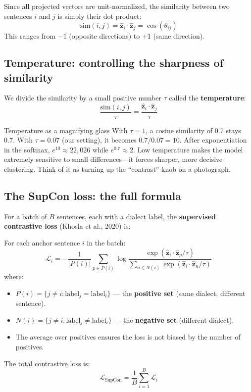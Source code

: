 \documentclass[11pt,a4paper]{article}
\theoremstyle{definition}
\begin{document}
Since all projected vectors are unit-normalized, the similarity
between two sentences $i$ and $j$ is simply their dot product:
\[
\text{sim}(i, j) = \hat{\mathbf{z}}_i \cdot \hat{\mathbf{z}}_j
= \cos(\theta_{ij})
\]
This ranges from $-1$ (opposite directions) to $+1$ (same direction).

\subsection{Temperature: controlling the sharpness of similarity}

We divide the similarity by a small positive number $\tau$ called the
\textbf{temperature}:
\[
\frac{\text{sim}(i,j)}{\tau}
= \frac{\hat{\mathbf{z}}_i \cdot \hat{\mathbf{z}}_j}{\tau}
\]

\begin{intuition}{Temperature as a magnifying glass}
With $\tau = 1$, a cosine similarity of 0.7 stays 0.7. With $\tau =
0.07$ (our setting), it becomes $0.7 / 0.07 = 10$. After
exponentiation in the softmax, $e^{10} \approx 22{,}026$ while
$e^{0.7} \approx 2$. Low temperature makes the model extremely
sensitive to small differences---it forces sharper, more decisive
clustering. Think of it as turning up the ``contrast'' knob on a
photograph.
\end{intuition}

\subsection{The SupCon loss: the full formula}

For a batch of $B$ sentences, each with a dialect label, the
\textbf{supervised contrastive loss} (Khosla et al., 2020) is:

\begin{mathbox}
For each anchor sentence $i$ in the batch:
\[
\mathcal{L}_i = -\frac{1}{|P(i)|}
\sum_{p \in P(i)}
\log \frac{
  \exp(\hat{\mathbf{z}}_i \cdot \hat{\mathbf{z}}_p / \tau)
}{
  \displaystyle\sum_{n \in N(i)} \exp(\hat{\mathbf{z}}_i \cdot \hat{\mathbf{z}}_n / \tau)
}
\]
where:
\begin{itemize}[nosep]
  \item $P(i) = \{j \neq i : \text{label}_j = \text{label}_i\}$ ---
        the \textbf{positive set} (same dialect, different sentence).
  \item $N(i) = \{j \neq i : \text{label}_j \neq \text{label}_i\}$ ---
        the \textbf{negative set} (different dialect).
  \item The average over positives ensures the loss is not biased by the
        number of positives.
\end{itemize}
The total contrastive loss is:
\[
\mathcal{L}_{\text{SupCon}} = \frac{1}{B} \sum_{i=1}^{B} \mathcal{L}_i
\]
\end{mathbox}
\end{document}
